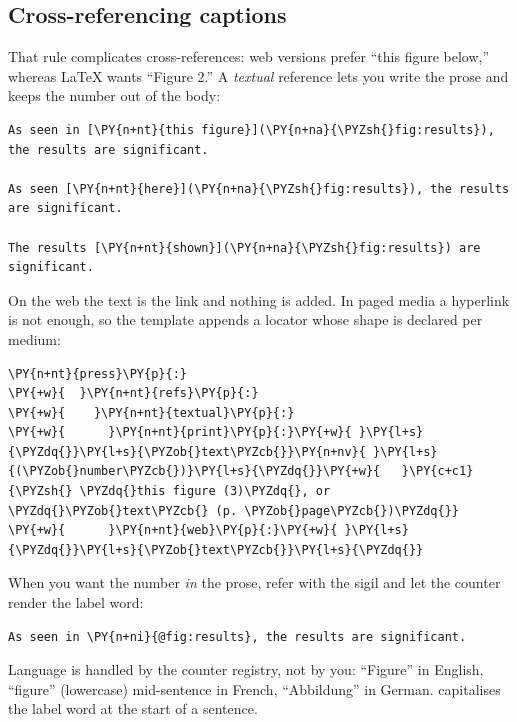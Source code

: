 \documentclass[a4paper,twoside]{article}
\begin{document}
\subsection{Cross-referencing captions}
That rule complicates cross-references: web versions prefer ``this figure below,'' whereas \LaTeX{} wants ``Figure 2.'' A \emph{textual} reference lets you write the prose and keeps the number out of the body:
\begin{tscode}[lang=md, engine=pygments]
\begin{Verbatim}[commandchars=\\\{\},breaklines, breakanywhere, commandchars=\\\{\}]
As seen in [\PY{n+nt}{this figure}](\PY{n+na}{\PYZsh{}fig:results}), the results are significant.

As seen [\PY{n+nt}{here}](\PY{n+na}{\PYZsh{}fig:results}), the results are significant.

The results [\PY{n+nt}{shown}](\PY{n+na}{\PYZsh{}fig:results}) are significant.
\end{Verbatim}
\end{tscode}
On the web the text is the link and nothing is added. In paged media a
hyperlink is not enough, so the template appends a locator whose shape is
declared per medium:
\begin{tscode}[lang=yaml, engine=pygments]
\begin{Verbatim}[commandchars=\\\{\},breaklines, breakanywhere, commandchars=\\\{\}]
\PY{n+nt}{press}\PY{p}{:}
\PY{+w}{  }\PY{n+nt}{refs}\PY{p}{:}
\PY{+w}{    }\PY{n+nt}{textual}\PY{p}{:}
\PY{+w}{      }\PY{n+nt}{print}\PY{p}{:}\PY{+w}{ }\PY{l+s}{\PYZdq{}}\PY{l+s}{\PYZob{}text\PYZcb{}}\PY{n+nv}{ }\PY{l+s}{(\PYZob{}number\PYZcb{})}\PY{l+s}{\PYZdq{}}\PY{+w}{   }\PY{c+c1}{\PYZsh{} \PYZdq{}this figure (3)\PYZdq{}, or \PYZdq{}\PYZob{}text\PYZcb{} (p. \PYZob{}page\PYZcb{})\PYZdq{}}
\PY{+w}{      }\PY{n+nt}{web}\PY{p}{:}\PY{+w}{ }\PY{l+s}{\PYZdq{}}\PY{l+s}{\PYZob{}text\PYZcb{}}\PY{l+s}{\PYZdq{}}
\end{Verbatim}
\end{tscode}
When you want the number \emph{in} the prose, refer with the  sigil and let the
counter render the label word:
\begin{tscode}[lang=md, engine=pygments]
\begin{Verbatim}[commandchars=\\\{\},breaklines, breakanywhere, commandchars=\\\{\}]
As seen in \PY{n+ni}{@fig:results}, the results are significant.
\end{Verbatim}
\end{tscode}
Language is handled by the counter registry, not by you: ``Figure'' in English,
``figure'' (lowercase) mid-sentence in French, ``Abbildung'' in German.
 capitalises the label word at the start of a sentence.
\end{document}
